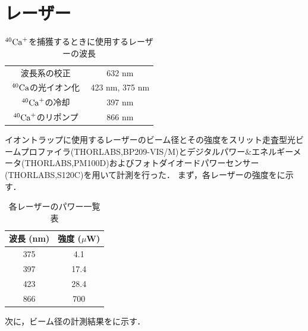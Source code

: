 \section{レーザー}
\begin{table}[h]
	\centering
		\caption{$^{40}{\rm Ca}^+$を捕獲するときに使用するレーザーの波長}
		\label{tb:use_laser}
			\begin{tabular}{c|c} \hline \hline
				波長系の校正 & 632 nm \\ 
				$^{40}{\rm Ca}$の光イオン化 & 423 nm, 375 nm \\
				$^{40}{\rm Ca}^+$の冷却 & 397 nm \\
				$^{40}{\rm Ca}^+$のリポンプ　& 866 nm \\ \hline 
			\end{tabular}
\end{table}
イオントラップに使用するレーザーのビーム径とその強度をスリット走査型光ビームプロファイラ(THORLABS,BP209-VIS/M)とデジタルパワー\&エネルギーメータ(THORLABS,PM100D)およびフォトダイオードパワーセンサー(THORLABS,S120C)を用いて計測を行った．
まず，各レーザーの強度をに示す．

\begin{table}[h]
	\begin{center}
		\caption{各レーザーのパワー一覧表}
		\label{tab:AllLaserPower}
		\begin{tabular}{c|c} \hline \hline
			波長 (nm) & 強度 ($\mu$W) \\ \hline
			375 &4.1 \\ \hline
			397 &17.4 \\ \hline
			423 &28.4 \\ \hline
			866 &700 \\ \hline
		\end{tabular}
	\end{center}
\end{table}

次に，ビーム径の計測結果をに示す．

